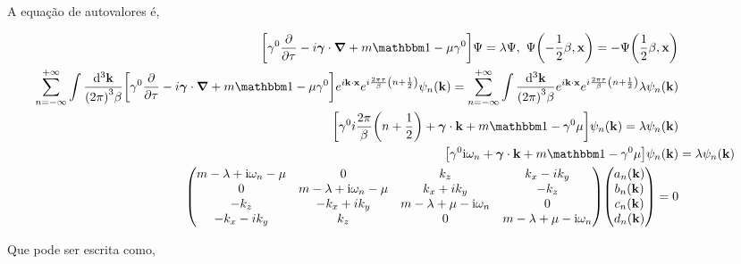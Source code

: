 \documentclass[twoside]{amsart}
\numberwithin{equation}{section}
\begin{document}
A equação de autovalores é,

\begin{align}
    \qty[\gamma^0 \pdv{}{\tau}-i\boldsymbol{\gamma}\cdot \grad+m\mathbbm 1-\mu\gamma^0]\Psi=\lambda\Psi,\ \Psi\qty(-\frac12\beta,\vb x)=-\Psi\qty(\frac12\beta,\vb x)\\
    \sum\limits_{n=-\infty}^{+\infty}\int\frac{\dd[3]{\vb k}}{\qty(2\pi)^3\beta}\qty[\gamma^0 \pdv{}{\tau}-i\boldsymbol{\gamma}\cdot \grad+m\mathbbm 1-\mu\gamma^0]e^{i\vb k\cdot\vb x}e^{i\frac{2\pi\tau}{\beta}\qty(n+\frac12)}\psi_n\qty(\vb k)=\sum\limits_{n=-\infty}^{+\infty}\int\frac{\dd[3]{\vb k}}{\qty(2\pi)^3\beta}e^{i\vb k\cdot\vb x}e^{i\frac{2\pi\tau}{\beta}\qty(n+\frac12)}\lambda\psi_n\qty(\vb k)\\
    \qty[\gamma^0i\frac{2\pi}{\beta}\qty(n+\frac12)+\boldsymbol\gamma\cdot\vb k+m\mathbbm 1-\gamma^0\mu]\psi_n\qty(\vb k)=\lambda\psi_n\qty(\vb k)\\
    \qty[\gamma^0\im\omega_n+\boldsymbol\gamma\cdot\vb k+m\mathbbm 1-\gamma^0\mu]\psi_n\qty(\vb k)&=\lambda\psi_n\qty(\vb k)\\
    \mqty(m-\lambda+\im\omega_n-\mu&0&k_z&k_x-ik_y\\0&m-\lambda+\im\omega_n-\mu&k_x+ik_y&-k_z\\-k_z&-k_x+ik_y&m-\lambda+\mu-\im\omega_n&0\\-k_x-ik_y&k_z&0&m-\lambda+\mu-\im\omega_n)\mqty(a_n\qty(\vb k)\\b_n\qty(\vb k)\\c_n\qty(\vb k)\\d_n\qty(\vb k))=0
\end{align}

Que pode ser escrita como,
\end{document}
